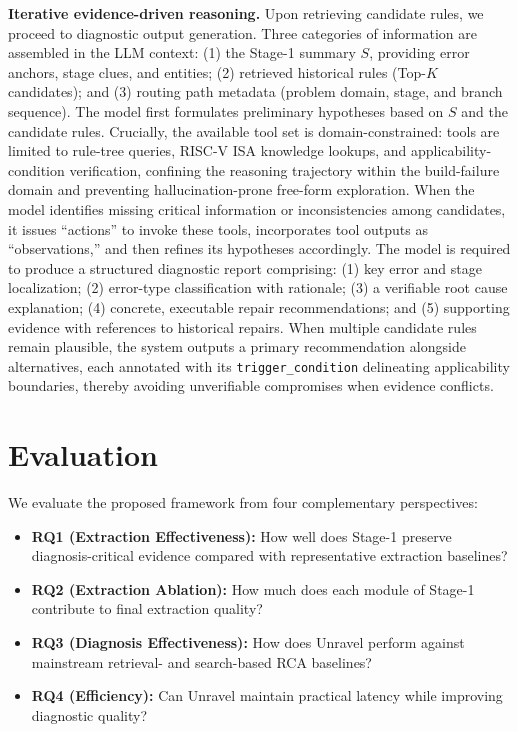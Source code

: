 \documentclass[sigconf,anonymous]{acmart}
\begin{document}
\textbf{Iterative evidence-driven reasoning.} Upon retrieving candidate rules, we proceed to diagnostic output generation. Three categories of information are assembled in the LLM context: (1) the Stage-1 summary $S$, providing error anchors, stage clues, and entities; (2) retrieved historical rules (Top-$K$ candidates); and (3) routing path metadata (problem domain, stage, and branch sequence). The model first formulates preliminary hypotheses based on $S$ and the candidate rules. Crucially, the available tool set is domain-constrained: tools are limited to rule-tree queries, RISC-V ISA knowledge lookups, and applicability-condition verification, confining the reasoning trajectory within the build-failure domain and preventing hallucination-prone free-form exploration. When the model identifies missing critical information or inconsistencies among candidates, it issues ``actions'' to invoke these tools, incorporates tool outputs as ``observations,'' and then refines its hypotheses accordingly. The model is required to produce a structured diagnostic report comprising: (1) key error and stage localization; (2) error-type classification with rationale; (3) a verifiable root cause explanation; (4) concrete, executable repair recommendations; and (5) supporting evidence with references to historical repairs. When multiple candidate rules remain plausible, the system outputs a primary recommendation alongside alternatives, each annotated with its \texttt{trigger\_condition} delineating applicability boundaries, thereby avoiding unverifiable compromises when evidence conflicts.

\section{Evaluation}

We evaluate the proposed framework from four complementary perspectives:
\begin{itemize}[leftmargin=*]
\item \textbf{RQ1 (Extraction Effectiveness):} How well does Stage-1 preserve diagnosis-critical evidence compared with representative extraction baselines?
\item \textbf{RQ2 (Extraction Ablation):} How much does each module of Stage-1 contribute to final extraction quality?
\item \textbf{RQ3 (Diagnosis Effectiveness):} How does Unravel perform against mainstream retrieval- and search-based RCA baselines?
\item \textbf{RQ4 (Efficiency):} Can Unravel maintain practical latency while improving diagnostic quality?
\end{itemize}
\end{document}
